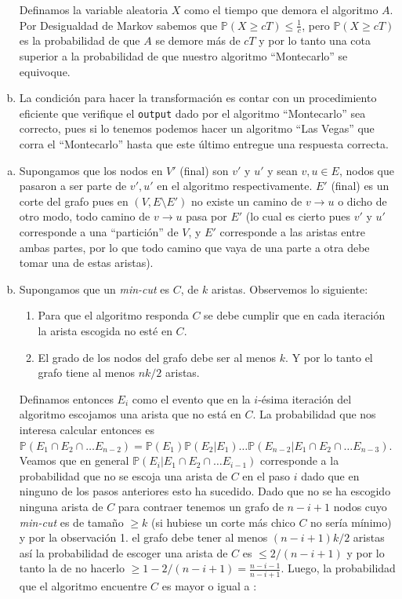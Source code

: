 \documentclass[dcc,uchile]{fcfmcourse}
\theoremstyle{plain}
\theoremstyle{definition}
\begin{document}
\begin{problems}
\begin{enumerate}[a)]
Definamos la variable aleatoria $X$ como el tiempo que demora el algoritmo $A$. Por Desigualdad de Markov sabemos que $\mathbb{P}(X\ge cT) \le \frac{1}{c}$, pero $\mathbb{P}(X\ge cT)$ es la probabilidad de que $A$ se demore más de $cT$ y por lo tanto una cota superior a la probabilidad de que nuestro algoritmo ``Montecarlo'' se equivoque.
\item La condición para hacer la transformación es contar con un procedimiento eficiente que verifique el \texttt{output} dado por el algoritmo ``Montecarlo'' sea correcto, pues si lo tenemos podemos hacer un algoritmo ``Las Vegas'' que corra el ``Montecarlo'' hasta que este último entregue una respuesta correcta.
\end{enumerate}
\problem
\begin{enumerate}[a)]
\item Supongamos que los nodos en $V'$ (final) son $v'$ y $u'$ y sean $v,u \in E$, nodos que pasaron a ser parte de $v',u'$ en el algoritmo respectivamente. $E'$ (final) es un corte del grafo pues en $(V, E\setminus E')$ no existe un camino de $v\to u$ o dicho de otro modo, todo camino de $v\to u$ pasa por $E'$ (lo cual es cierto pues $v'$ y $u'$ corresponde a una ``partición'' de $V$, y $E'$ corresponde a las aristas entre ambas partes, por lo que todo camino que vaya de una parte a otra debe tomar una de estas aristas).
\item Supongamos que un \textit{min-cut} es $C$, de $k$ aristas. Observemos lo siguiente:
\begin{enumerate}[1.]
    \item Para que el algoritmo responda $C$ se debe cumplir que en cada iteración la arista escogida no esté en $C$.
    \item El grado de los nodos del grafo debe ser al menos $k$. Y por lo tanto el grafo tiene al menos $nk/2$ aristas.
\end{enumerate}
Definamos entonces $E_{i}$ como el evento que en la $i$-ésima iteración del algoritmo escojamos una arista que no está en $C$. La probabilidad que nos interesa calcular entonces es $\mathbb{P}(E_{1}\cap E_{2} \cap \ldots E_{n-2}) = \mathbb{P}(E_{1})\mathbb{P}(E_{2}|E_{1}) \ldots \mathbb{P}(E_{n-2}| E_{1}\cap E_{2} \cap \ldots E_{n-3})$.\\
Veamos que en general $\mathbb{P}(E_{i}| E_{1}\cap E_{2} \cap \ldots E_{i-1})$ corresponde a la probabilidad que no se escoja una arista de $C$ en el paso $i$ dado que en ninguno de los pasos anteriores esto ha sucedido. Dado que no se ha escogido ninguna arista de $C$ para contraer tenemos un grafo de $n-i+1$ nodos cuyo \textit{min-cut} es de tamaño $\ge k$ (si hubiese un corte más chico $C$ no sería mínimo) y por la observación 1. el grafo debe tener al menos $(n-i+1)k/2$ aristas así la probabilidad de escoger una arista de $C$ es $\le 2/(n-i+1)$ y por lo tanto la de no hacerlo $\ge 1-2/(n-i+1) = \frac{n-i-1}{n-i+1}$. Luego, la probabilidad que el algoritmo encuentre $C$ es mayor o igual a :

\end{enumerate}
\end{problems}
\end{document}

